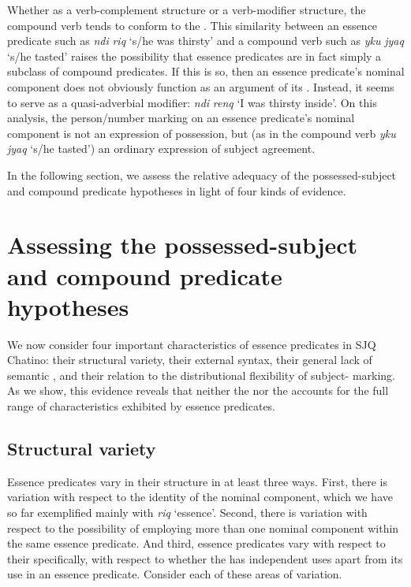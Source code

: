 \documentclass[output=paper]{langsci/langscibook}
\begin{document}
Whether as a verb-complement structure or a verb-modifier structure, the compound verb tends to conform to the . This similarity between an essence predicate such as \emph{ndi} \emph{riq} `s/he was thirsty' and a compound verb such as \emph{yku} \emph{jyaq} `s/he tasted' raises the possibility that essence predicates are in fact simply a subclass of compound predicates.  If this is so, then an essence predicate's nominal component does not obviously function as an argument of its .  Instead, it seems to serve as a quasi-adverbial modifier:  \emph{ndi} \emph{renq} `I was thirsty inside'.  On this analysis, the person/number marking on an essence predicate's nominal component is not an expression of possession, but (as in the compound verb \emph{yku} \emph{jyaq} `s/he tasted') an ordinary expression of subject agreement.

In the following section, we assess the relative adequacy of the possessed-subject and compound predicate hypotheses in light of four kinds of evidence. 


\section{Assessing the possessed-subject and compound predicate hypotheses}

We now consider four important characteristics of essence predicates in SJQ Chatino:  their structural variety, their external syntax, their general lack of semantic , and their relation to the distributional flexibility of subject- marking.  As we show, this evidence reveals that neither the  nor the  accounts for the full range of characteristics exhibited by essence predicates.

\subsection{Structural variety}

Essence predicates vary in their structure in at least three ways. First, there is
variation with respect to the identity of the nominal component, which we have so far exemplified mainly
with \emph{riq} `essence'. Second, there is variation with respect to the possibility of employing more than one nominal component within the same essence predicate.    And third, essence predicates vary with respect to their \textemdash specifically, with respect to whether the  has independent uses apart from its use in an essence predicate.  Consider each of these areas of variation. 
\end{document}

